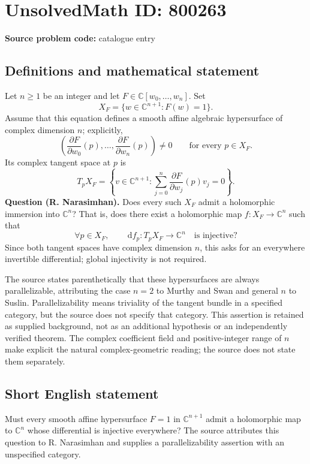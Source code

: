 \documentclass[11pt]{article}
\newcommand{\C}{\mathbb{C}}
\newcommand{\dd}{\,\mathrm{d}}
\begin{document}
\section*{UnsolvedMath ID: 800263}
\textbf{Source problem code:} catalogue entry
\subsection{Definitions and mathematical statement}
Let \(n\geq 1\) be an integer and let \(F\in\C[w_0,\ldots,w_n]\). Set
\[
X_F=\{w\in\C^{n+1}:F(w)=1\}.
\]
Assume that this equation defines a smooth affine algebraic hypersurface of complex dimension \(n\); explicitly,
\[
\left(\frac{\partial F}{\partial w_0}(p),\ldots,\frac{\partial F}{\partial w_n}(p)\right)\neq 0
\qquad\text{for every }p\in X_F.
\]
Its complex tangent space at \(p\) is
\[
T_pX_F=\left\{v\in\C^{n+1}:\sum_{j=0}^{n}\frac{\partial F}{\partial w_j}(p)v_j=0\right\}.
\]
\textbf{Question (R. Narasimhan).} Does every such \(X_F\) admit a holomorphic immersion into \(\C^n\)? That is, does there exist a holomorphic map \(f:X_F\to\C^n\) such that
\[
\forall p\in X_F,\qquad \dd f_p:T_pX_F\longrightarrow\C^n
\quad\text{is injective}?
\]
Since both tangent spaces have complex dimension \(n\), this asks for an everywhere invertible differential; global injectivity is not required.

The source states parenthetically that these hypersurfaces are always parallelizable, attributing the case \(n=2\) to Murthy and Swan and general \(n\) to Suslin. Parallelizability means triviality of the tangent bundle in a specified category, but the source does not specify that category. This assertion is retained as supplied background, not as an additional hypothesis or an independently verified theorem. The complex coefficient field and positive-integer range of \(n\) make explicit the natural complex-geometric reading; the source does not state them separately.
\subsection{Short English statement}
Must every smooth affine hypersurface \(F=1\) in \(\C^{n+1}\) admit a holomorphic map to \(\C^n\) whose differential is injective everywhere? The source attributes this question to R. Narasimhan and supplies a parallelizability assertion with an unspecified category.
\end{document}
